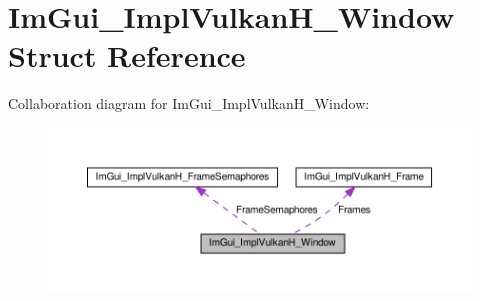 \hypertarget{structImGui__ImplVulkanH__Window}{}\section{Im\+Gui\+\_\+\+Impl\+Vulkan\+H\+\_\+\+Window Struct Reference}
\label{structImGui__ImplVulkanH__Window}


Collaboration diagram for Im\+Gui\+\_\+\+Impl\+Vulkan\+H\+\_\+\+Window\+:\nopagebreak
\begin{figure}[H]
\begin{center}
\leavevmode
\includegraphics[width=350pt]{structImGui__ImplVulkanH__Window__coll__graph}
\end{center}
\end{figure}
